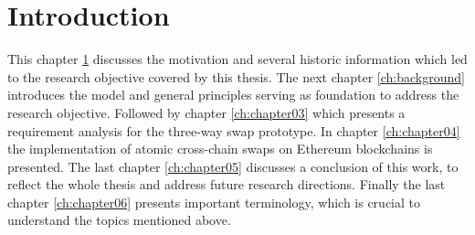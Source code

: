 %
%
\chapter{Introduction}
\label{ch:intro}
This chapter \ref{ch:intro} discusses the motivation and several historic information which led to the research objective covered by this thesis. The next chapter \ref{ch:background} introduces the model and general principles serving as foundation to address the research objective. Followed by chapter \ref{ch:chapter03} which presents a requirement analysis for the three-way swap prototype. In chapter \ref{ch:chapter04} the implementation of atomic cross-chain swaps on Ethereum blockchains is presented. The last chapter \ref{ch:chapter05} discusses a conclusion of this work, to reflect the whole thesis and address future research directions. Finally the last chapter \ref{ch:chapter06} presents important terminology, which is crucial to understand the topics mentioned above.

%
%
